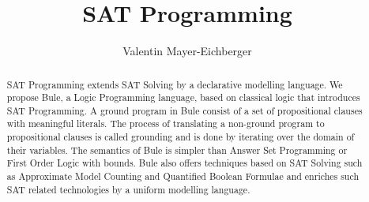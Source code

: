 \documentclass[conference]{IEEEtran}
\title{ SAT Programming}
\author{\IEEEauthorblockN{Jean Christoph Jung}

\IEEEauthorblockA{\textit{Universit\"at Bremen} \\ Bremen, Germany} \and
Valentin Mayer-Eichberger \\
\IEEEauthorblockA{\textit{Technische Universit\"at Berlin} \\ Berlin, Germany}
}
\begin{document}
\maketitle

\newcommand{\bflat}{\ensuremath{\text{Bule}_\text{flat}}\xspace}
\newcommand{\bcore}{\ensuremath{\text{Bule}_\text{core}}\xspace}
\newcommand{\bfull}{\ensuremath{\text{Bule}_\text{full}}\xspace}
\newcommand{\bule}{\ensuremath{\text{Bule}}\xspace}

\begin{abstract}
    SAT Programming extends SAT Solving by a declarative modelling language. 
    We propose Bule, a Logic Programming language, based on classical logic that introduces SAT Programming. 
    A ground program in Bule consist of a set of propositional clauses with meaningful literals. 
    The process of translating a non-ground program to propositional clauses is called grounding and is done by iterating over the domain of their variables. 
    The semantics of Bule is simpler than Answer Set Programming or First Order Logic with bounds.  
    Bule also offers techniques based on SAT Solving such as Approximate Model Counting and Quantified Boolean Formulae 
    and enriches such SAT related technologies by a uniform modelling language. 





\end{abstract}
\end{document}
